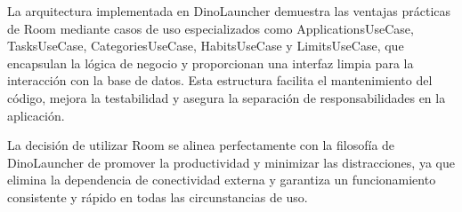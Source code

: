 La arquitectura implementada en DinoLauncher demuestra las ventajas prácticas de Room mediante casos de uso especializados como ApplicationsUseCase, TasksUseCase, CategoriesUseCase, HabitsUseCase y LimitsUseCase, que encapsulan la lógica de negocio y proporcionan una interfaz limpia para la interacción con la base de datos. Esta estructura facilita el mantenimiento del código, mejora la testabilidad y asegura la separación de responsabilidades en la aplicación.

La decisión de utilizar Room se alinea perfectamente con la filosofía de DinoLauncher de promover la productividad y minimizar las distracciones, ya que elimina la dependencia de conectividad externa y garantiza un funcionamiento consistente y rápido en todas las circunstancias de uso.